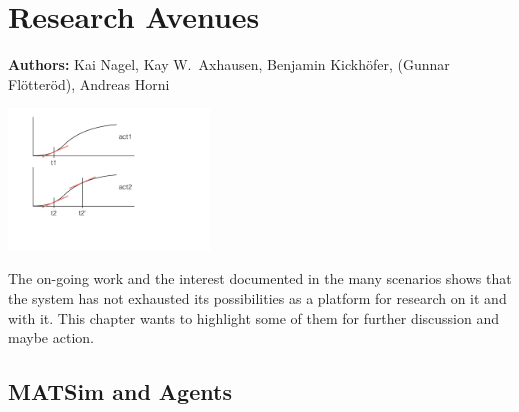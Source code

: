 \chapter{Research Avenues}
\label{ch:researchavenues}

\hfill \textbf{Authors:} Kai Nagel, Kay W.\ Axhausen, Benjamin Kickhöfer, (Gunnar Flötteröd), Andreas Horni

\begin{center} \includegraphics[width=0.4\textwidth, angle=0]{figures/stable-activity-allocations} \end{center}

The on-going work and the interest documented in the many scenarios shows 
that the system has not exhausted its possibilities as a platform for research on it and with it. 
This chapter wants to highlight some of them for further discussion and maybe action. 

\section{MATSim and Agents}

%
%




